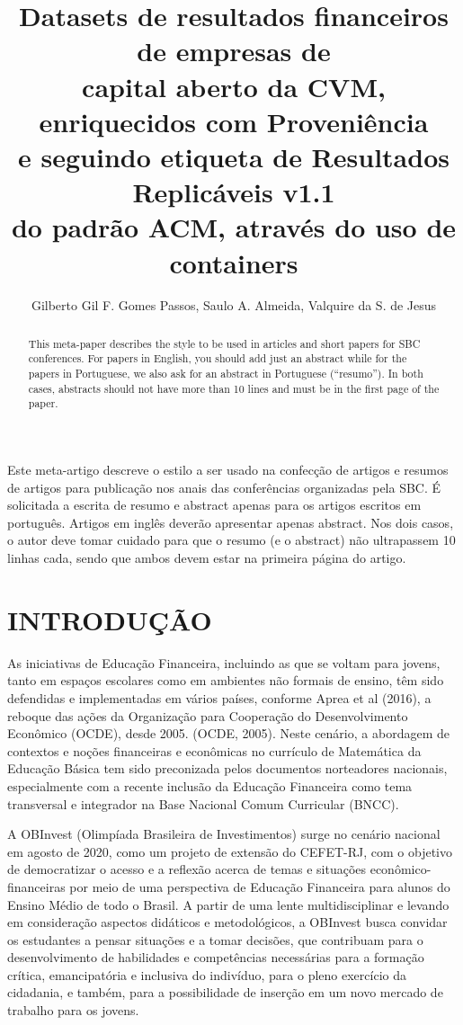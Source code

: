 \documentclass[12pt]{article}
\title{Datasets de resultados financeiros de empresas de \\
capital aberto da CVM, enriquecidos com Proveniência\\  
e seguindo etiqueta de Resultados Replicáveis v1.1\\ 
do padrão ACM, através do uso de containers}
\author{Gilberto Gil F. Gomes Passos\inst{1}, Saulo A. Almeida\inst{1}, Valquire da S. de Jesus\inst{1} }
\begin{document}
 

\maketitle

\begin{abstract}
  This meta-paper describes the style to be used in articles and short papers
  for SBC conferences. For papers in English, you should add just an abstract
  while for the papers in Portuguese, we also ask for an abstract in
  Portuguese (``resumo''). In both cases, abstracts should not have more than
  10 lines and must be in the first page of the paper.
\end{abstract}
     
\begin{resumo} 
  Este meta-artigo descreve o estilo a ser usado na confecção de artigos e
  resumos de artigos para publicação nos anais das conferências organizadas
  pela SBC. É solicitada a escrita de resumo e abstract apenas para os artigos
  escritos em português. Artigos em inglês deverão apresentar apenas abstract.
  Nos dois casos, o autor deve tomar cuidado para que o resumo (e o abstract)
  não ultrapassem 10 linhas cada, sendo que ambos devem estar na primeira
  página do artigo.
\end{resumo}


\section{INTRODUÇÃO}

As iniciativas de Educação Financeira, incluindo as que se voltam para jovens, tanto em espaços escolares como em ambientes não formais de ensino, têm sido defendidas e implementadas em vários países, conforme Aprea et al (2016), a reboque das ações da Organização para Cooperação do Desenvolvimento Econômico (OCDE), desde 2005. (OCDE, 2005). Neste cenário, a abordagem de contextos e noções financeiras e econômicas no currículo de Matemática da Educação Básica tem sido preconizada pelos documentos norteadores nacionais, especialmente com a recente inclusão da Educação Financeira como tema transversal e integrador na Base Nacional Comum Curricular (BNCC).

A OBInvest (Olimpíada Brasileira de Investimentos) surge no cenário nacional em agosto de 2020, como um projeto de extensão do CEFET-RJ, com o objetivo de democratizar o acesso e a reflexão acerca de temas e situações econômico-financeiras por meio de uma perspectiva de Educação Financeira para alunos do Ensino Médio de todo o Brasil. A partir de uma lente multidisciplinar e levando em consideração aspectos didáticos e metodológicos, a OBInvest busca convidar os estudantes a pensar situações e a tomar decisões, que contribuam para o desenvolvimento de habilidades e competências necessárias para a formação crítica, emancipatória e inclusiva do indivíduo, para o pleno exercício da cidadania, e também, para a possibilidade de inserção em um novo mercado de trabalho para os jovens. 
\end{document}
